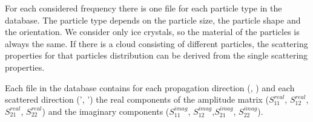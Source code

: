 For each considered frequency there is one file for each particle
type in the database. The particle
type depends on the particle size, the particle shape and the
orientation. We consider only ice crystals, so the material of the
particles is always the same. If there is a cloud consisting of
different particles, the scattering properties for that particles
distribution can be derived from the single scattering properties.

Each file in the database contains for each propagation direction (\ScaZa,
\ScaAa) and each scattered direction (\ScaZa', \ScaAa') the real
components of the amplitude matrix ($S^{real}_{11}$, $S^{real}_{12}$,
$S^{real}_{21}$, $S^{real}_{22}$) and the imaginary components
($S^{imag}_{11}$, $S^{imag}_{12}$,$S^{imag}_{21}$, $S^{imag}_{22}$).



\label{sec:scattering:gen_ext_abs}

